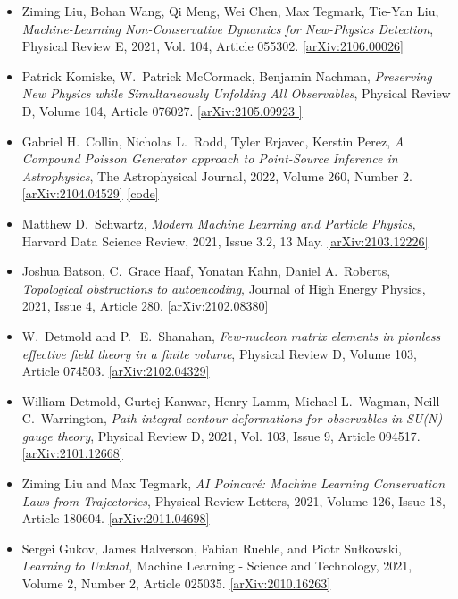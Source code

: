 \begin{itemize}
\item Ziming Liu, Bohan Wang, Qi Meng, Wei Chen, Max Tegmark, Tie-Yan Liu, \textit{Machine-Learning Non-Conservative Dynamics for New-Physics Detection}, Physical Review E, 2021, Vol. 104, Article 055302. \href{https://arxiv.org/abs/2106.00026}{[arXiv:2106.00026]} 
\item Patrick Komiske, W.\  Patrick McCormack, Benjamin Nachman, \textit{Preserving New Physics while Simultaneously Unfolding All Observables}, Physical Review D, Volume 104, Article 076027. \href{https://arxiv.org/abs/2105.09923 }{[arXiv:2105.09923 ]} 
\item Gabriel H.\  Collin, Nicholas L.\  Rodd, Tyler Erjavec, Kerstin Perez, \textit{A Compound Poisson Generator approach to Point-Source Inference in Astrophysics}, The Astrophysical Journal, 2022, Volume 260, Number 2. \href{https://arxiv.org/abs/2104.04529}{[arXiv:2104.04529]}  \href{https://github.com/ghcollin/cpg_likelihood}{[code]} 
\item Matthew D.\  Schwartz, \textit{Modern Machine Learning and Particle Physics}, Harvard Data Science Review, 2021, Issue 3.2, 13 May. \href{https://arxiv.org/abs/2103.12226}{[arXiv:2103.12226]} 
\item Joshua Batson, C.\  Grace Haaf, Yonatan Kahn, Daniel A.\  Roberts, \textit{Topological obstructions to autoencoding}, Journal of High Energy Physics, 2021, Issue 4, Article 280. \href{https://arxiv.org/abs/2102.08380}{[arXiv:2102.08380]} 
\item W.\  Detmold and P.\  E.\  Shanahan, \textit{Few-nucleon matrix elements in pionless effective field theory in a finite volume}, Physical Review D, Volume 103, Article 074503. \href{https://arxiv.org/abs/2102.04329}{[arXiv:2102.04329]} 
\item William Detmold, Gurtej Kanwar, Henry Lamm, Michael L.\  Wagman, Neill C.\  Warrington, \textit{Path integral contour deformations for observables in SU(N) gauge theory}, Physical Review D, 2021, Vol. 103, Issue 9, Article 094517. \href{https://arxiv.org/abs/2101.12668}{[arXiv:2101.12668]} 
\item Ziming Liu and Max Tegmark, \textit{AI Poincaré: Machine Learning Conservation Laws from Trajectories}, Physical Review Letters, 2021, Volume 126, Issue 18, Article 180604. \href{https://arxiv.org/abs/2011.04698}{[arXiv:2011.04698]} 
\item Sergei Gukov, James Halverson, Fabian Ruehle, and Piotr Sułkowski, \textit{Learning to Unknot}, Machine Learning - Science and Technology, 2021, Volume 2, Number 2, Article 025035. \href{https://arxiv.org/abs/2010.16263}{[arXiv:2010.16263]} 
\end{itemize}